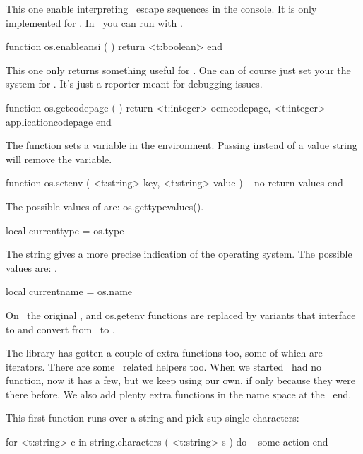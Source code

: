 This one enable interpreting \ANSI\ escape sequences in the console. It is only
implemented for \MSWINDOWS. In \CONTEXT\ you can run with .

\starttyping[option=LUA]
function os.enableansi ( )
    return <t:boolean>
end
\stoptyping

This one only returns something useful for \MSWINDOWS. One can of course just set
your the system for . It's just a reporter meant for debugging issues.

\starttyping[option=LUA]
function os.getcodepage ( )
    return
        <t:integer> oemcodepage,
        <t:integer> applicationcodepage
end
\stoptyping

The  function sets a variable in the environment. Passing
 instead of a value string will remove the variable.

\starttyping[option=LUA]
function os.setenv (
    <t:string> key,
    <t:string> value
)
    -- no return values
end
\stoptyping

The possible values of  are: \showenginekeylist
{os.gettypevalues()}.

\starttyping[option=LUA]
local currenttype = os.type
\stoptyping

The  string gives a more precise indication of the operating
system. The possible values are: .

\starttyping[option=LUA]
local currentname = os.name
\stoptyping

On \MSWINDOWS\ the original ,  and \type
{os.getenv} functions are replaced by variants that interface to and convert from
\ to .

\stopsubsection

\startsubsection[title=Extra string helpers]

The  library has gotten a couple of extra functions too, some of
which are iterators. There are some \UNICODE\ related helpers too. When we
started \LUA\ had no  function, now it has a few, but we keep using our own,
if only because they were there before. We also add plenty extra functions in the
 name space at the \LUA\ end.

This first function runs over a string and pick sup single characters:

\starttyping[option=LUA]
for <t:string> c in string.characters ( <t:string> s ) do
    -- some action
end
\stoptyping

